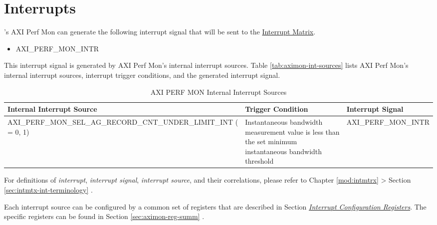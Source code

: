 \documentclass[main\_\_EN.tex]{subfiles}
\begin{document}
\section{Interrupts}

\chipname{}'s AXI Perf Mon can generate the following interrupt signal that will be sent to the \hyperref[mod:intmtrx]{Interrupt Matrix}.

    \begin{itemize}
        \item AXI\_PERF\_MON\_INTR
    \end{itemize}

This interrupt signal is generated by AXI Perf Mon's internal interrupt sources. Table \ref{tab:aximon-int-sources} lists AXI Perf Mon's internal interrupt sources, interrupt trigger conditions, and the generated interrupt signal.


\begin{longtable}{ | L{6cm} | L{6.5cm} | L{3.5cm} | }
\caption{AXI PERF MON Internal Interrupt Sources} \label{tab:aximon-int-sources}
\\ \hline
{}
\textbf{Internal Interrupt Source} & \textbf{Trigger Condition}  &  \textbf{Interrupt Signal}\\ \hline
{AXI\_\-PERF\_\-MON\_\-SEL\_\-AG\_\-RECORD\_\-CNT\_\-UNDER\_\-LIMIT\_\-INT ( = 0, 1)}\label{int:AXIPERFMONSELAGNRECORDCNTUNDERLIMITINT} &  Instantaneous bandwidth measurement value is less than the set minimum instantaneous bandwidth threshold &  AXI\_PERF\_MON\_INTR  \\ \hline
\end{longtable}


\begin{tiplisting}
For definitions of \textit{interrupt}, \textit{interrupt signal}, \textit{interrupt source}, and their correlations, please refer to Chapter \ref{mod:intmtrx} \textit{} > Section \ref{sec:intmtx-int-terminology} \textit{}.
\end{tiplisting}

Each interrupt source can be configured by a common set of registers that are described in Section \hyperref[interrupt-config-registers]{\textit{Interrupt Configuration Registers}}. The specific registers can be found in Section \ref{sec:aximon-reg-summ} \textit{}.

\end{document}
